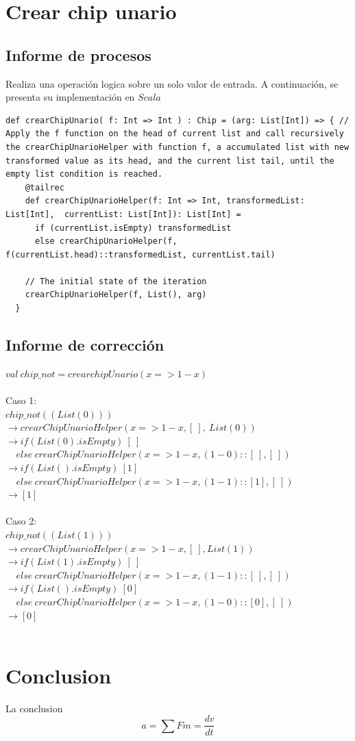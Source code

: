 \documentclass[12pt, a4paper]{article}
\begin{document}
\section{Crear chip unario}
\subsection{Informe de procesos}
Realiza una operación logica sobre un solo valor de entrada. A continuación, se presenta su implementación en $Scala$ \\[16pt]
\begin{lstlisting}[style=scalaStyle, caption=Aplica una operación binaria sobre una valor de entrada.]
  def crearChipUnario( f: Int => Int ) : Chip = (arg: List[Int]) => { // Apply the f function on the head of current list and call recursively the crearChipUnarioHelper with function f, a accumulated list with new transformed value as its head, and the current list tail, until the empty list condition is reached.
    @tailrec
    def crearChipUnarioHelper(f: Int => Int, transformedList: List[Int],  currentList: List[Int]): List[Int] =
      if (currentList.isEmpty) transformedList
      else crearChipUnarioHelper(f, f(currentList.head)::transformedList, currentList.tail)

    // The initial state of the iteration
    crearChipUnarioHelper(f, List(), arg)
  }
\end{lstlisting}
\subsection{Informe de corrección}
$val~chip\_not = crearchipUnario(x => 1- x)$ \\ \\
Caso 1: \\ 
$chip\_not((List(0)))$ \\
$\rightarrow crearChipUnarioHelper(x => 1 - x, [~], ~List(0))$ \\
$\rightarrow if (List(0).isEmpty)~[~] $ \\
$~~~~~else~crearChipUnarioHelper(x => 1 - x, (1 - 0)::[~], [~])$ \\
$\rightarrow if (List().isEmpty)~[1] $ \\
$~~~~~else~crearChipUnarioHelper(x => 1 - x, (1 - 1)::[1], [~])$ \\
$\rightarrow [1]$ \\ \\
Caso 2: \\ 
$chip\_not((List(1)))$ \\
$\rightarrow crearChipUnarioHelper(x => 1- x, [~], List(1))$ \\
$\rightarrow if (List(1).isEmpty)~[~] $ \\
$~~~~~else~crearChipUnarioHelper(x => 1 - x, (1 - 1)::[~], [~])$ \\
$\rightarrow if (List().isEmpty)~[0] $ \\
$~~~~~else~crearChipUnarioHelper(x => 1 - x, (1 - 0)::[0], [~])$ \\
$\rightarrow [0]$ \\ \\
\section{Conclusion}
La conclusion
\newpage{}
\begin{displaymath}
 a = \sum F \dot m = \frac{dv}{dt}
\end{displaymath}
\end{document}
